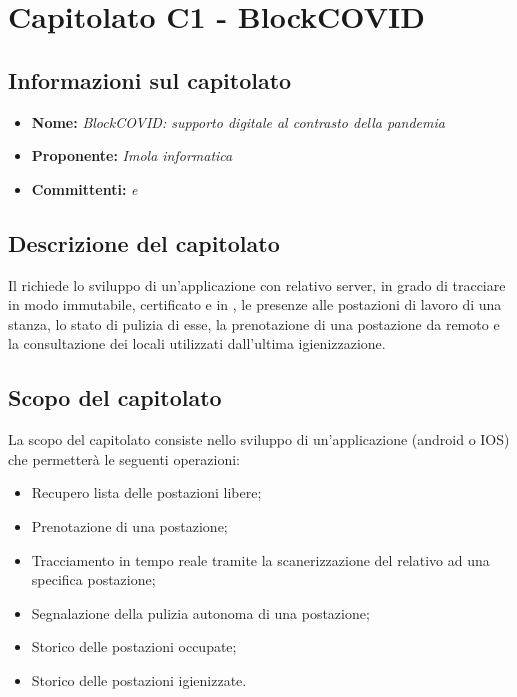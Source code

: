 \section{Capitolato C1 - BlockCOVID}\label{C1}
\subsection{Informazioni sul capitolato}
\begin{itemize}
	\item \textbf{Nome:} \textit{BlockCOVID: supporto digitale al contrasto della pandemia}
	\item \textbf{Proponente:} \textit{Imola informatica}
	\item \textbf{Committenti:} \textit{\VT{} e \CR{}}
\end{itemize}

\subsection{Descrizione del capitolato}
Il  richiede lo sviluppo di un'applicazione con relativo server, in grado di tracciare in modo immutabile, certificato e in , le presenze alle postazioni di lavoro di una stanza, lo stato di pulizia di esse, la prenotazione di una postazione da remoto e la consultazione dei locali utilizzati dall'ultima igienizzazione.

\subsection{Scopo del capitolato}
La scopo del capitolato consiste nello sviluppo di un'applicazione (android o IOS) che permetterà le seguenti operazioni:
\begin{itemize}
	\item Recupero lista delle postazioni libere;
	\item Prenotazione di una postazione;
	\item Tracciamento in tempo reale tramite la scanerizzazione del  relativo ad una specifica postazione;
	\item Segnalazione della pulizia autonoma di una postazione;
	\item Storico delle postazioni occupate;
	\item Storico delle postazioni igienizzate.
\end{itemize}

